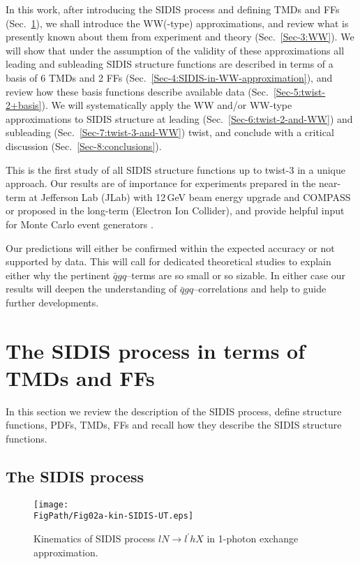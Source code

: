 \documentclass[a4paper,11pt]{article}
\newcommand{\blue}[1]{{\color{blue} #1}}
\newcommand{\ps}[1]{\blue{ #1}}
\newcommand*{\FigPath}{./figs}%
\begin{document}
In this work, after introducing the SIDIS process and defining TMDs and FFs 
(Sec.~\ref{Sec-2:SIDIS+TMDs+FF}), we shall introduce the WW(-type) 
approximations, and review what is presently known about them 
from experiment and theory (Sec.~\ref{Sec-3:WW}).
We will show that under the assumption of the validity of these approximations 
all leading and subleading SIDIS structure functions are described in terms of 
a basis of 6 TMDs and 2 FFs (Sec.~\ref{Sec-4:SIDIS-in-WW-approximation}),
and review how these basis functions describe available data 
(Sec.~\ref{Sec-5:twist-2+basis}).
We will systematically apply the WW and/or WW-type approximations
to SIDIS structure at leading (Sec.~\ref{Sec-6:twist-2-and-WW}) 
and subleading (Sec.~\ref{Sec-7:twist-3-and-WW}) twist, and
conclude with a critical discussion (Sec.~\ref{Sec-8:conclusions}).

This is the first study of all SIDIS structure functions up to twist-3 
in a unique approach. Our results are of importance for experiments prepared 
in the near-term at \ps{Jefferson Lab (JLab) with 12$\,$GeV beam energy
upgrade and COMPASS} or proposed in the long-term  
(Electron Ion Collider), and provide helpful input for Monte Carlo event
generators \cite{Avakian:2015vha}.

Our predictions will either be confirmed within the expected accuracy
\ps{or not supported by data. This will call for dedicated theoretical 
studies to explain either why the pertinent $\bar{q}gq$--terms are 
so small or so sizable. In either case our results will deepen the 
understanding of  $\bar{q}gq$--correlations and help to guide 
further developments.}

\newpage
\section{The SIDIS process in terms of TMDs and FFs}
\label{Sec-2:SIDIS+TMDs+FF}

In this section we review the description of the SIDIS process, 
define structure functions, PDFs, TMDs, FFs and recall how they
describe the SIDIS structure functions.

\subsection{The SIDIS process}
\label{Sec-2.1:SIDIS+structure-functions}

\begin{wrapfigure}[8]{RD}{8cm}
\vspace{-7mm}
\centering
	\texttt{[image: \\FigPath/Fig02a-kin-SIDIS-UT.eps]}
        \caption{\label{fig-kin-SIDIS}
    	Kinematics of SIDIS process $lN\to l^\prime h X$
	in 1-photon exchange approximation.}
\vspace{-5mm}
\end{wrapfigure}
\end{document}
